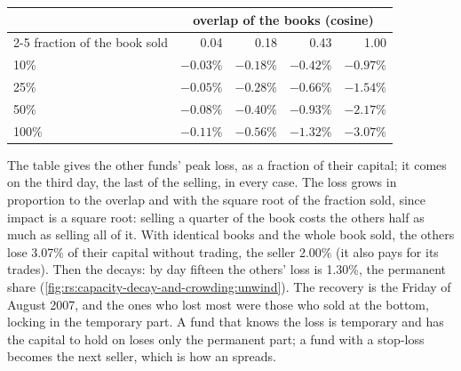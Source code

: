 \begin{center}
\small
\begin{tabular}{@{}lrrrr@{}}
\toprule
 & \multicolumn{4}{c}{overlap of the books (cosine)}\\
\cmidrule(l){2-5}
fraction of the book sold & 0.04 & 0.18 & 0.43 & 1.00\\
\midrule
10\% & $-0.03\%$ & $-0.18\%$ & $-0.42\%$ & $-0.97\%$\\
25\% & $-0.05\%$ & $-0.28\%$ & $-0.66\%$ & $-1.54\%$\\
50\% & $-0.08\%$ & $-0.40\%$ & $-0.93\%$ & $-2.17\%$\\
100\% & $-0.11\%$ & $-0.56\%$ & $-1.32\%$ & $-3.07\%$\\
\bottomrule
\end{tabular}
\end{center}

The table gives the other funds' peak loss, as a fraction of their capital; it comes on the third day, the last of the selling, in every case. The loss grows
in proportion to the overlap and with the square root of the fraction sold, since impact is a square root: selling a quarter of the book costs the others half as
much as selling all of it. With identical books and the whole book sold, the others lose 3.07\% of their capital without trading, the seller 2.00\% (it also pays
for its trades). Then the  decays: by day fifteen the others' loss is 1.30\%, the permanent share (\cref{fig:rs:capacity-decay-and-crowding:unwind}).
The recovery is the Friday of August 2007, and the ones who lost most were those who sold at the bottom, locking in the temporary part. A fund that knows the
loss is temporary and has the capital to hold on loses only the permanent part; a fund with a stop-loss becomes the next seller, which is how an  spreads.

